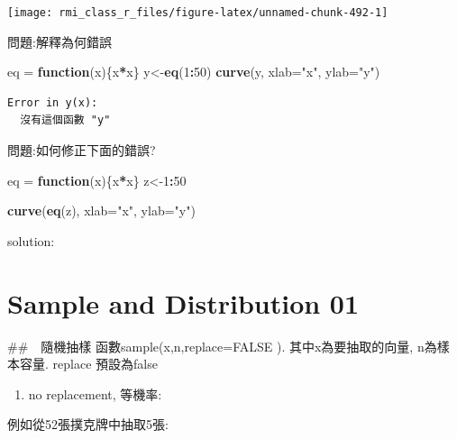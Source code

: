 \documentclass[]{book}
\newenvironment{Shaded}{\begin{snugshade}}{\end{snugshade}}
\newcommand{\ControlFlowTok}[1]{\textcolor[rgb]{0.13,0.29,0.53}{\textbf{#1}}}
\newcommand{\DataTypeTok}[1]{\textcolor[rgb]{0.13,0.29,0.53}{#1}}
\newcommand{\DecValTok}[1]{\textcolor[rgb]{0.00,0.00,0.81}{#1}}
\newcommand{\KeywordTok}[1]{\textcolor[rgb]{0.13,0.29,0.53}{\textbf{#1}}}
\newcommand{\NormalTok}[1]{#1}
\newcommand{\OperatorTok}[1]{\textcolor[rgb]{0.81,0.36,0.00}{\textbf{#1}}}
\newcommand{\StringTok}[1]{\textcolor[rgb]{0.31,0.60,0.02}{#1}}
\providecommand{\tightlist}{%
  \setlength{\itemsep}{0pt}\setlength{\parskip}{0pt}}
\theoremstyle{definition}
\theoremstyle{definition}
\theoremstyle{definition}
\theoremstyle{remark}
\begin{document}
\begin{center}\texttt{[image: rmi\_class\_r\_files/figure-latex/unnamed-chunk-492-1]} \end{center}

問題:解釋為何錯誤

\begin{Shaded}
\begin{Highlighting}[]
\NormalTok{eq =}\StringTok{ }\ControlFlowTok{function}\NormalTok{(x)\{x}\OperatorTok{*}\NormalTok{x\}}
\NormalTok{y<-}\KeywordTok{eq}\NormalTok{(}\DecValTok{1}\OperatorTok{:}\DecValTok{50}\NormalTok{)}
\KeywordTok{curve}\NormalTok{(y, }\DataTypeTok{xlab=}\StringTok{"x"}\NormalTok{, }\DataTypeTok{ylab=}\StringTok{"y"}\NormalTok{)}
\end{Highlighting}
\end{Shaded}

\begin{verbatim}
Error in y(x):
  沒有這個函數 "y"
\end{verbatim}

問題:如何修正下面的錯誤?

\begin{Shaded}
\begin{Highlighting}[]
\NormalTok{eq =}\StringTok{ }\ControlFlowTok{function}\NormalTok{(x)\{x}\OperatorTok{*}\NormalTok{x\}}
\NormalTok{z<-}\DecValTok{1}\OperatorTok{:}\DecValTok{50}

\KeywordTok{curve}\NormalTok{(}\KeywordTok{eq}\NormalTok{(z), }\DataTypeTok{xlab=}\StringTok{"x"}\NormalTok{, }\DataTypeTok{ylab=}\StringTok{"y"}\NormalTok{)}
\end{Highlighting}
\end{Shaded}

solution:

\hypertarget{sample-and-distribution-01}{%
\chapter{Sample and Distribution 01}\label{sample-and-distribution-01}}

\#\#　隨機抽樣 函數sample(x,n,replace=FALSE ). 其中x為要抽取的向量,
n為樣本容量. replace 預設為false

\begin{enumerate}
\def\labelenumi{\arabic{enumi}.}
\tightlist
\item
  no replacement, 等機率:
\end{enumerate}

例如從52張撲克牌中抽取5張:
\end{document}
